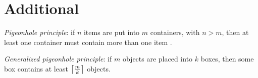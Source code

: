 \section{Additional}

{\it Pigeonhole principle}: if $n$ items are put into $m$ containers, with $n > m$, then at least one container must contain more than one item \cite{pigeonhole-principle}.

{\it Generalized pigeonhole principle}: if $m$ objects are placed into $k$ boxes, then some box contains at least $\ceil*{\frac{m}{k}}$ objects.
